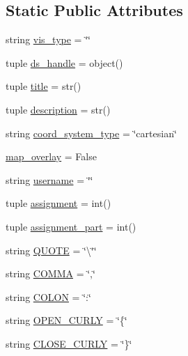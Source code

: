 \subsection*{Static Public Attributes}
\begin{DoxyCompactItemize}
\item 
string \hyperlink{class_bridges_1_1_bridges_1_1_bridges_a27bc30c5de41aa3495c25ad7ee9a07f7}{vis\+\_\+type} = \char`\"{}\char`\"{}
\item 
tuple \hyperlink{class_bridges_1_1_bridges_1_1_bridges_ae3b9f976d68036ca83ef7d45c554a4f8}{ds\+\_\+handle} = object()
\item 
tuple \hyperlink{class_bridges_1_1_bridges_1_1_bridges_ad02d0b0bcd679a3d7dd2dd2736b8aa58}{title} = str()
\item 
tuple \hyperlink{class_bridges_1_1_bridges_1_1_bridges_ad5ec1f7917cbe6321273b4a22a1bab50}{description} = str()
\item 
string \hyperlink{class_bridges_1_1_bridges_1_1_bridges_ac3a61fdcc5140d0bb81b2f03fcf314c7}{coord\+\_\+system\+\_\+type} = \char`\"{}cartesian\char`\"{}
\item 
\hyperlink{class_bridges_1_1_bridges_1_1_bridges_adc6bb7b47d0e2faf4db40b74a2bcfe81}{map\+\_\+overlay} = False
\item 
string \hyperlink{class_bridges_1_1_bridges_1_1_bridges_a4b2e284c3e910633af57a02fe73cc714}{username} = \char`\"{}\char`\"{}
\item 
tuple \hyperlink{class_bridges_1_1_bridges_1_1_bridges_ac0e73586c3543580d1b2628145f045ac}{assignment} = int()
\item 
tuple \hyperlink{class_bridges_1_1_bridges_1_1_bridges_a2490eab66818122cbfd3034cfbda5463}{assignment\+\_\+part} = int()
\item 
string \hyperlink{class_bridges_1_1_bridges_1_1_bridges_afad910c4cafccab64f5dc4cce8668507}{Q\+U\+O\+T\+E} = \char`\"{}\textbackslash{}\char`\"{}\char`\"{}
\item 
string \hyperlink{class_bridges_1_1_bridges_1_1_bridges_a8ab95ee4bc36d93b78f3ebb8a55e9b27}{C\+O\+M\+M\+A} = \char`\"{},\char`\"{}
\item 
string \hyperlink{class_bridges_1_1_bridges_1_1_bridges_a0606ce0192b51d878e54a7d5ed639fcb}{C\+O\+L\+O\+N} = \char`\"{}\+:\char`\"{}
\item 
string \hyperlink{class_bridges_1_1_bridges_1_1_bridges_ad26eb626e32645acd1df4b7151fb80c5}{O\+P\+E\+N\+\_\+\+C\+U\+R\+L\+Y} = \char`\"{}\{\char`\"{}
\item 
string \hyperlink{class_bridges_1_1_bridges_1_1_bridges_a460ec6a9b83237b9a44a09beea04a519}{C\+L\+O\+S\+E\+\_\+\+C\+U\+R\+L\+Y} = \char`\"{}\}\char`\"{}

\end{DoxyCompactItemize}
